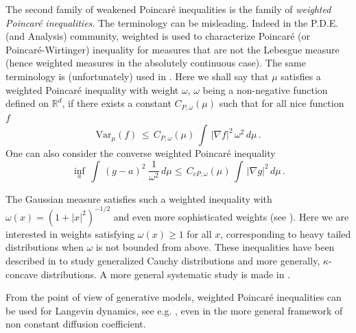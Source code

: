 \documentclass[11pt,reqno]{amsart}
\numberwithin{equation}{section}
\theoremstyle{definition}
\theoremstyle{remark}
\def \Var {\textrm{Var}}
\begin{document}
\quad The second family of weakened Poincar\'e inequalities is the family of \emph{weighted Poincar\'e inequalities}. The terminology can be misleading. Indeed in the P.D.E. (and Analysis) community, weighted is used to characterize Poincar\'e  (or Poincar\'e-Wirtinger) inequality for measures that are not the Lebesgue measure (hence weighted measures in the absolutely continuous case). The same terminology is (unfortunately) used in \cite{BCG}. Here we shall say that $\mu$ satisfies a weighted Poincar\'e inequality with weight $\omega$, $\omega$ being a non-negative function defined on $\mathbb R^d$, if there exists a constant $C_{P,\omega}(\mu)$ such that for all nice function $f$
\begin{equation}\label{eqweP}
\Var_\mu(f) \, \leq \, C_{P,\omega}(\mu) \, \int \, |\nabla f|^2 \, \omega^2 \, d\mu \, .
\end{equation}
One can also consider the converse weighted Poincar\'e inequality 
\begin{equation}\label{eqconvweP}
\inf_a \, \int \, (g-a)^2 \; \frac{1}{\omega^2} \, d\mu \leq \, C_{cP,\omega}(\mu) \, \int \, |\nabla g|^2 \, d\mu \, .
\end{equation}

The Gaussian measure satisfies such a weighted inequality with $\omega(x)=(1+|x|^2)^{-1/2}$ and even more sophisticated weights (see \cite{Goz}). Here we are interested in weights satisfying $\omega(x) \geq 1$ for all $x$, corresponding to heavy tailed distributions when $\omega$ is not bounded from above. These inequalities have been described in \cite{BLweight,BLweight2} to study generalized Cauchy distributions and more generally, $\kappa$-concave distributions. A more general systematic study is made in \cite{CGGR}. 

From the point of view of generative models, weighted Poincar\'e inequalities can be used for Langevin dynamics, see e.g. \cite{cui2025optimalriemannianmetricpoincare, lelievre2025optimizingdiffusioncoefficientoverdamped}, even in the more general framework of non constant diffusion coefficient. 
\end{document}
